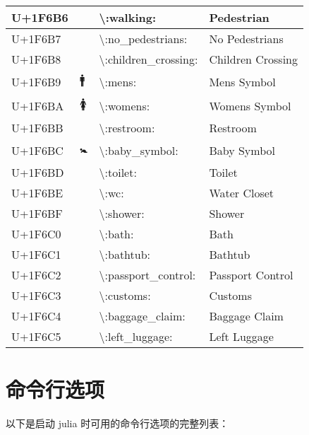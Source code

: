\begin{table}[h]
\begin{tabulary}{\linewidth}{|L|L|L|L|}
\hline
U+1F6B6 & 🚶 & {\textbackslash}:walking: & Pedestrian \\
\hline
U+1F6B7 & 🚷 & {\textbackslash}:no\_pedestrians: & No Pedestrians \\
\hline
U+1F6B8 & 🚸 & {\textbackslash}:children\_crossing: & Children Crossing \\
\hline
U+1F6B9 & 🚹 & {\textbackslash}:mens: & Mens Symbol \\
\hline
U+1F6BA & 🚺 & {\textbackslash}:womens: & Womens Symbol \\
\hline
U+1F6BB & 🚻 & {\textbackslash}:restroom: & Restroom \\
\hline
U+1F6BC & 🚼 & {\textbackslash}:baby\_symbol: & Baby Symbol \\
\hline
U+1F6BD & 🚽 & {\textbackslash}:toilet: & Toilet \\
\hline
U+1F6BE & 🚾 & {\textbackslash}:wc: & Water Closet \\
\hline
U+1F6BF & 🚿 & {\textbackslash}:shower: & Shower \\
\hline
U+1F6C0 & 🛀 & {\textbackslash}:bath: & Bath \\
\hline
U+1F6C1 & 🛁 & {\textbackslash}:bathtub: & Bathtub \\
\hline
U+1F6C2 & 🛂 & {\textbackslash}:passport\_control: & Passport Control \\
\hline
U+1F6C3 & 🛃 & {\textbackslash}:customs: & Customs \\
\hline
U+1F6C4 & 🛄 & {\textbackslash}:baggage\_claim: & Baggage Claim \\
\hline
U+1F6C5 & 🛅 & {\textbackslash}:left\_luggage: & Left Luggage \\
\hline
\end{tabulary}

\end{table}



\hypertarget{7890528511117722792}{}


\chapter{命令行选项}



以下是启动 julia 时可用的命令行选项的完整列表：




